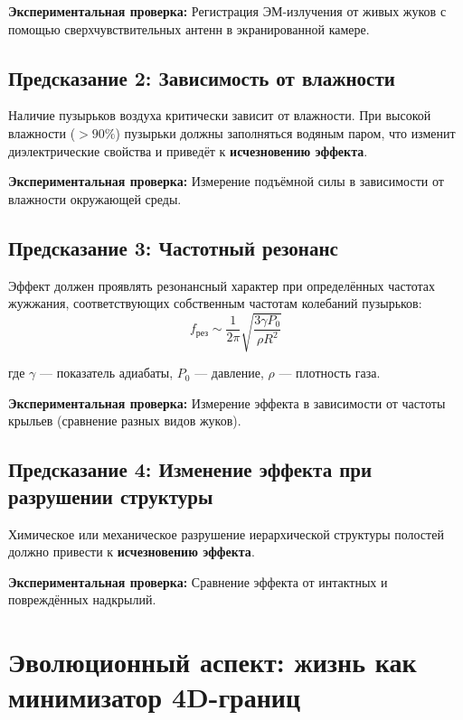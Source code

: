 \documentclass[12pt,a4paper]{article}
\begin{document}
\textbf{Экспериментальная проверка:} Регистрация ЭМ-излучения от живых жуков с помощью сверхчувствительных антенн в экранированной камере.

\subsection{Предсказание 2: Зависимость от влажности}

Наличие пузырьков воздуха критически зависит от влажности. При высокой влажности ($> 90\%$) пузырьки должны заполняться водяным паром, что изменит диэлектрические свойства и приведёт к \textbf{исчезновению эффекта}.

\textbf{Экспериментальная проверка:} Измерение подъёмной силы в зависимости от влажности окружающей среды.

\subsection{Предсказание 3: Частотный резонанс}

Эффект должен проявлять резонансный характер при определённых частотах жужжания, соответствующих собственным частотам колебаний пузырьков:
\begin{equation}
    f_{\text{рез}} \sim \frac{1}{2\pi} \sqrt{\frac{3\gamma P_0}{\rho R^2}}
    \label{eq:resonance}
\end{equation}

где $\gamma$ --- показатель адиабаты, $P_0$ --- давление, $\rho$ --- плотность газа.

\textbf{Экспериментальная проверка:} Измерение эффекта в зависимости от частоты крыльев (сравнение разных видов жуков).

\subsection{Предсказание 4: Изменение эффекта при разрушении структуры}

Химическое или механическое разрушение иерархической структуры полостей должно привести к \textbf{исчезновению эффекта}.

\textbf{Экспериментальная проверка:} Сравнение эффекта от интактных и повреждённых надкрылий.

\section{Эволюционный аспект: жизнь как минимизатор 4D-границ}
\end{document}
